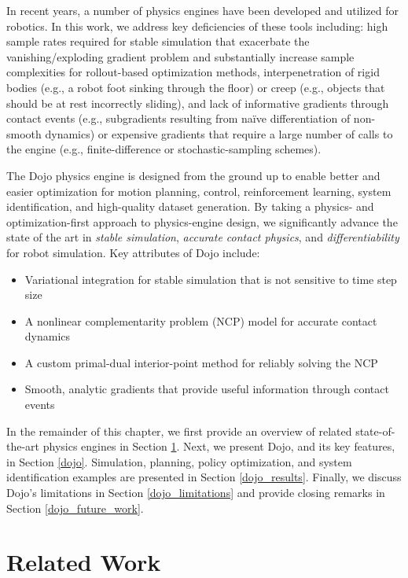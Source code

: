 In recent years, a number of physics engines \cite{drake, freeman2021brax, werling2021fast, geilinger2020add, hu2019difftaichi, heiden2020neuralsim} have been developed and utilized for robotics. In this work, we address key deficiencies of these tools including: high sample rates required for stable simulation that exacerbate the vanishing/exploding gradient problem and substantially increase sample complexities for rollout-based optimization methods, interpenetration of rigid bodies (e.g., a robot foot sinking through the floor) or creep (e.g., objects that should be at rest incorrectly sliding), and lack of informative gradients  through contact events (e.g., subgradients resulting from naïve differentiation of non-smooth dynamics) or expensive gradients that require a large number of calls to the engine (e.g., finite-difference or stochastic-sampling schemes).

The Dojo physics engine is designed from the ground up to enable better and easier optimization for motion planning, control, reinforcement learning, system identification, and high-quality dataset generation. By taking a physics- and optimization-first approach to physics-engine design, we significantly advance the state of the art in \textit{stable simulation}, \textit{accurate contact physics}, and \textit{differentiability} for robot simulation. Key attributes of Dojo include: 
\begin{itemize}
	\item Variational integration for stable simulation that is not sensitive to time step size
	\item A nonlinear complementarity problem (NCP) model for accurate contact dynamics
	\item A custom primal-dual interior-point method for reliably solving the NCP 
	\item Smooth, analytic gradients that provide useful information through contact events
\end{itemize}

In the remainder of this chapter, we first provide an overview of related state-of-the-art physics engines in Section \ref{dojo_related_work}. Next, we present Dojo, and its key features, in Section \ref{dojo}. Simulation, planning, policy optimization, and system identification examples are presented in Section \ref{dojo_results}. Finally, we discuss Dojo's limitations in Section \ref{dojo_limitations} and provide closing remarks in Section \ref{dojo_future_work}.

\section{Related Work} \label{dojo_related_work}

